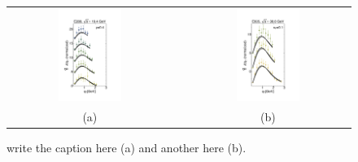 \documentclass[aps,preprintnumbers,showpacs,nofootinbib,superscriptaddress,floatfix]{revtex4}
\begin{document}
\begin{figure}[h!]
\centering
\begin{tabular}{ccc}
\includegraphics[width=0.40\textwidth]{plots/DY-Z/DY_SCIplot_flINDEP_3.pdf}
&\hspace{0.001cm}
&
\includegraphics[width=0.40\textwidth]{plots/DY-Z/DY_SCIplot_flINDEP_4.pdf}
\\
(a) && (b)
\end{tabular}
\caption{write the caption here (a) and another here (b).}
\label{f:DY_panel_2}
\end{figure}
\end{document}
